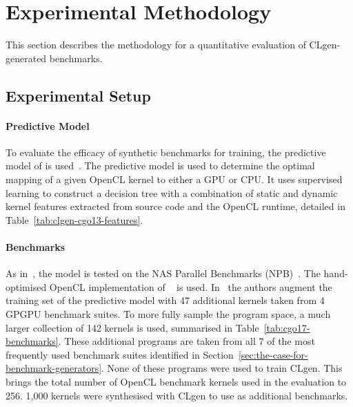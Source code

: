 \section{Experimental Methodology}
\label{sec:clgen-eval-methodology}

This section describes the methodology for a quantitative evaluation of CLgen-generated benchmarks.

\subsection{Experimental Setup}

\paragraph*{Predictive Model}

To evaluate the efficacy of synthetic benchmarks for training, the predictive model of \citeauthor{Grewe2013} is used~\cite{Grewe2013}. The predictive model is used to determine the optimal mapping of a given OpenCL kernel to either a GPU or CPU. It uses supervised learning to construct a decision tree with a combination of static and dynamic kernel features extracted from source code and the OpenCL runtime, detailed in Table~\ref{tab:clgen-cgo13-features}.

\begin{table}
	\centering%
	\caption[\citeauthor{Grewe2013} features for heterogeneous device mapping]{%
		Features used by \citeauthor{Grewe2013} to predict CPU/GPU mapping of OpenCL kernels. The features are extracted using a custom analysis pass built using LLVM.
	}%
	\label{tab:clgen-cgo13-features} %
\end{table}

\paragraph*{Benchmarks}

As in~\cite{Grewe2013}, the model is tested on the NAS Parallel Benchmarks (NPB)~\cite{Bailey1991a}. The hand-optimised OpenCL implementation of \citeauthor{Seo2011}~\cite{Seo2011} is used. In~\cite{Grewe2013} the authors augment the training set of the predictive model with 47 additional kernels taken from 4 GPGPU benchmark suites. To more fully sample the program space, a much larger collection of 142 kernels is used, summarised in Table~\ref{tab:cgo17-benchmarks}. These additional programs are taken from all 7 of the most frequently used benchmark suites identified in Section~\ref{sec:the-case-for-benchmark-generators}. None of these programs were used to train CLgen. This brings the total number of OpenCL benchmark kernels used in the evaluation to 256. 1,000 kernels were synthesised with CLgen to use as additional benchmarks.


